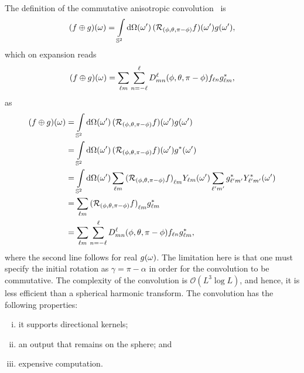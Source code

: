 The definition of the commutative anisotropic convolution~\cite{Sadeghi2012,Khalid2012} is
%
\begin{equation}
    \pixel{(f \oplus g)}
    = \integrateSphere{\omega'} \pixel[']{(\rotation{(\phi,\theta,\pi-\phi)}f)} \pixel[']{g},
\end{equation}
%
which on expansion reads
%
\begin{equation}
    \pixel{(f \oplus g)}
    = \harmonicSum \wignerSum \wigner{\ell}{m}{n}(\phi,\theta,\pi-\phi) f_{\ell n} \conj{\harmonic{g}},
\end{equation}
%
as
%
\begin{align}
    \pixel{(f \oplus g)}
     & = \integrateSphere{\omega'} \pixel[']{(\rotation{(\phi,\theta,\pi-\phi)}f)} \pixel[']{g} \nonumber{}                                                                                                  \\
     & = \integrateSphere{\omega'} \pixel[']{(\rotation{(\phi,\theta,\pi-\phi)}f)} \pixel[']{\conj{g}} \nonumber{}                                                                                                  \\
     & = \integrateSphere{\omega'} \harmonicSum \harmonic{(\rotation{(\phi,\theta,\pi-\phi)}f)} \pixel[']{\harmonic{Y}} \harmonicSum['] \conj{\harmonic[']{g}} \pixel[']{\conj{\harmonic[']{Y}}} \nonumber{} \\
     & = \harmonicSum \harmonic{(\rotation{(\phi,\theta,\pi-\phi)}f)} \conj{\harmonic{g}} \nonumber{}                                                                                                        \\
     & = \harmonicSum \wignerSum \wigner{\ell}{m}{n}(\phi,\theta,\pi-\phi) f_{\ell n} \conj{\harmonic{g}},
\end{align}
%
where the second line follows for real \(\pixel{g}\).
The limitation here is that one must specify the initial rotation as \({\gamma=\pi-\alpha}\) in order for the convolution to be commutative.
The complexity of the convolution is \(\mathcal{O}(L^{3}\log{L})\), and hence, it is less efficient than a spherical harmonic transform.
The convolution has the following properties:
%
\begin{enumerate}[(i),nosep,left=\parindent]
    \item it supports directional kernels;
    \item an output that remains on the sphere; and
    \item expensive computation.
\end{enumerate}

